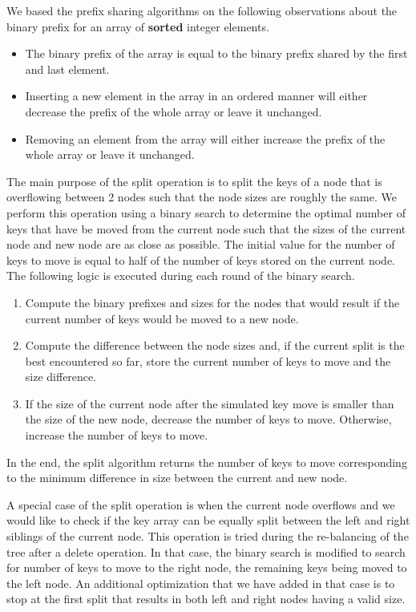 \documentclass[11pt,a4paper,oneside]{article}
\begin{document}
We based the prefix sharing algorithms on the following observations about the binary prefix for an array of \textbf{sorted} integer elements.
\begin{itemize}
	\item The binary prefix of the array is equal to the binary prefix shared by the first and last element.
	\item Inserting a new element in the array in an ordered manner will either decrease the prefix of the whole array or leave it unchanged.
	\item Removing an element from the array will either increase the prefix of the whole array or leave it unchanged.
\end{itemize}

The main purpose of the split operation is to split the keys of a node that is overflowing between 2 nodes such that the node sizes are roughly the same. We perform this operation using a binary search to determine the optimal number of keys that have be moved from the current node such that the sizes of the current node and new node are as close as possible. The initial value for the number of keys to move is equal to half of the number of keys stored on the current node. The following logic is executed during each round of the binary search. 
\begin{enumerate}
	\item Compute the binary prefixes and sizes for the nodes that would result if the current number of keys would be moved to a 
	new node. 
	\item Compute the difference between the node sizes and, if the current split is the best encountered so far, store the current number of keys to move and the size difference.
	\item If the size of the current node after the simulated key move is smaller than the size of the new node, decrease the number of keys to move. Otherwise, increase the number of keys to move.
\end{enumerate}
In the end, the split algorithm returns the number of keys to move corresponding to the minimum difference in size between the current and new node.

A special case of the split operation is when the current node overflows and we would like to check if the key array can be equally split between the left and right siblings of the current node. This operation is tried during the re-balancing of the tree after a delete operation. In that case, the binary search is modified to search for number of keys to move to the right node, the remaining keys being moved to the left node. An additional optimization that we have added in that case is to stop at the first split that results in both left and right nodes having a valid size.
\end{document}
